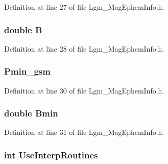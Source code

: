 Definition at line 27 of file Lgm\_\-MagEphemInfo.h.\hypertarget{struct_lgm___mag_ephem_info_df085adbf76beb194ac436d42cd1d725}{
\subsubsection[{B}]{\setlength{\rightskip}{0pt plus 5cm}double {\bf B}}}
\label{struct_lgm___mag_ephem_info_df085adbf76beb194ac436d42cd1d725}




Definition at line 28 of file Lgm\_\-MagEphemInfo.h.\hypertarget{struct_lgm___mag_ephem_info_da6476a5f53c9e2d9ac6f1b1b28a37b3}{
\subsubsection[{Pmin\_\-gsm}]{ {\bf Pmin\_\-gsm}}}
\label{struct_lgm___mag_ephem_info_da6476a5f53c9e2d9ac6f1b1b28a37b3}




Definition at line 30 of file Lgm\_\-MagEphemInfo.h.\hypertarget{struct_lgm___mag_ephem_info_2ac3a99381d281d4caabf024a33f0b31}{
\subsubsection[{Bmin}]{\setlength{\rightskip}{0pt plus 5cm}double {\bf Bmin}}}
\label{struct_lgm___mag_ephem_info_2ac3a99381d281d4caabf024a33f0b31}




Definition at line 31 of file Lgm\_\-MagEphemInfo.h.\hypertarget{struct_lgm___mag_ephem_info_beeccfbf7295d0c631353a9159972a74}{
\subsubsection[{UseInterpRoutines}]{\setlength{\rightskip}{0pt plus 5cm}int {\bf UseInterpRoutines}}}
\label{struct_lgm___mag_ephem_info_beeccfbf7295d0c631353a9159972a74}




